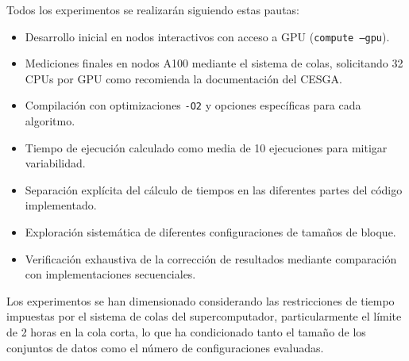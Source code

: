     Todos los experimentos se realizarán siguiendo estas pautas:
    
    \begin{itemize}
        \item Desarrollo inicial en nodos interactivos con acceso a GPU (\texttt{compute --gpu}).
        \item Mediciones finales en nodos A100 mediante el sistema de colas, solicitando 32 CPUs por GPU como recomienda la documentación del CESGA.
        \item Compilación con optimizaciones \texttt{-O2} y opciones específicas para cada algoritmo.
        \item Tiempo de ejecución calculado como media de 10 ejecuciones para mitigar variabilidad.
        \item Separación explícita del cálculo de tiempos en las diferentes partes del código implementado.
        \item Exploración sistemática de diferentes configuraciones de tamaños de bloque.
        \item Verificación exhaustiva de la corrección de resultados mediante comparación con implementaciones secuenciales.
    \end{itemize}
	
    Los experimentos se han dimensionado considerando las restricciones de tiempo impuestas por el sistema de colas del supercomputador, particularmente el límite de 2 horas en la cola corta, lo que ha condicionado tanto el tamaño de los conjuntos de datos como el número de configuraciones evaluadas.
